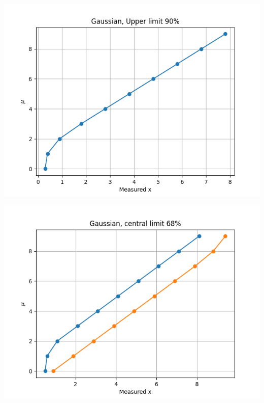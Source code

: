 \documentclass[a4paper,11pt]{article}
\begin{document}
\begin{center}
\includegraphics[width=.9\linewidth]{gaussian_upper.png}
\end{center}

\begin{center}
\includegraphics[width=.9\linewidth]{gaussian_central.png}
\end{center}
\end{document}
